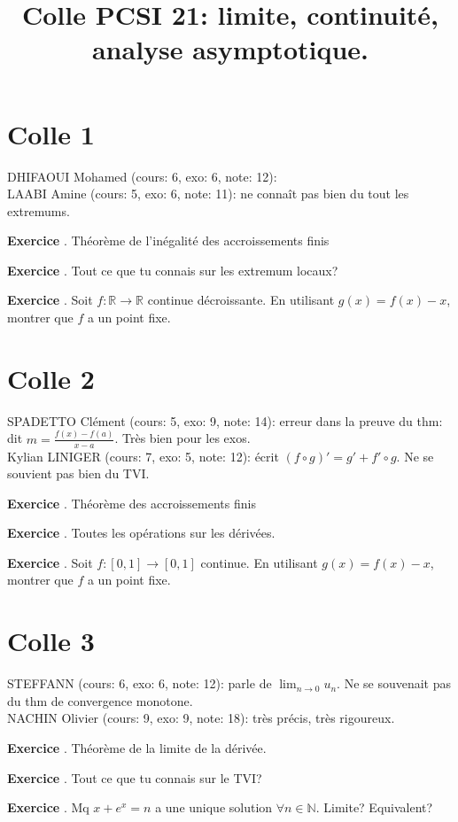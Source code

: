 \documentclass[10pt,a4paper]{article}
\title{Colle PCSI 21: limite, continuité, analyse asymptotique.}
\newcounter{question}
\newcounter{exo}
\newenvironment{exo}{\vspace{0.5cm}\setcounter{question}{0}\addtocounter{exo}{1} \noindent \textbf{Exercice \theexo}. \normalsize }{\par}
\begin{document}
	\maketitle
	
	
	\section*{Colle 1}
	\setcounter{exo}{0}
	DHIFAOUI Mohamed (cours: 6, exo: 6, note: 12): \\
	LAABI Amine (cours: 5, exo: 6, note: 11): ne connaît pas bien du tout les extremums.\\
	
	\begin{exo}
		Théorème de l'inégalité des accroissements finis
	\end{exo}

	\begin{exo}
		Tout ce que tu connais sur les extremum locaux?
	\end{exo}
	
	\begin{exo}
		Soit $f: \mathbb{R} \rightarrow \mathbb{R}$ continue décroissante. En utilisant $g(x) = f(x) - x$, montrer que $f$ a un point fixe.
	\end{exo}	

	\section*{Colle 2}
	\setcounter{exo}{0}
	SPADETTO Clément (cours: 5, exo: 9, note: 14): erreur dans la preuve du thm: dit $m =\frac{f(x) - f(a)}{x-a}$. Très bien pour les exos.\\
	Kylian LINIGER (cours: 7, exo: 5, note: 12): écrit $(f \circ g)' = g' + f' \circ g$. Ne se souvient pas bien du TVI.\\
	
	\begin{exo}
		Théorème des accroissements finis
	\end{exo}		

	\begin{exo}
		Toutes les opérations sur les dérivées.
	\end{exo}

	\begin{exo}
		Soit $f: [0, 1] \rightarrow [0, 1]$ continue. En utilisant $g(x) = f(x) - x$, montrer que $f$ a un point fixe.
	\end{exo}

	\section*{Colle 3}
	\setcounter{exo}{0}
	STEFFANN (cours: 6, exo: 6, note: 12): parle de $\lim_{n \longrightarrow 0} u_n$. Ne se souvenait pas du thm de convergence monotone.\\
	NACHIN Olivier (cours: 9, exo: 9, note: 18): très précis, très rigoureux.\\
	
	\begin{exo}
		Théorème de la limite de la dérivée.
	\end{exo}		
	
	\begin{exo}
		Tout ce que tu connais sur le TVI?
	\end{exo}
	
	\begin{exo}
		Mq $x + e^x = n$ a une unique solution $\forall n \in \mathbb{N}$. Limite? Equivalent?
	\end{exo}	
\end{document}
